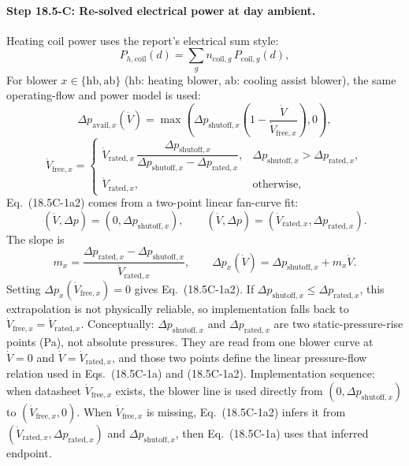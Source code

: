 \documentclass[11pt]{article}
\begin{document}
\paragraph{Step 18.5-C: Re-solved electrical power at day ambient.}
Heating coil power uses the report's electrical sum style:
\begin{equation}
P_{h,\mathrm{coil}}(d)=\sum_g n_{\mathrm{coil},g}\,P_{\mathrm{coil},g}(d),
\tag{31}
\end{equation}
\noindent For blower \(x\in\{\mathrm{hb},\mathrm{ab}\}\) (\(\mathrm{hb}\): heating blower, \(\mathrm{ab}\): cooling assist blower), the same operating-flow and power model is used:
\begin{equation}
\Delta p_{\mathrm{avail},x}(\dot V)=\max\!\left(\Delta p_{\mathrm{shutoff},x}\left(1-\frac{\dot V}{\dot V_{\mathrm{free},x}}\right),0\right),
\tag{18.5C-1a}
\end{equation}
\begin{equation}
\dot V_{\mathrm{free},x}=
\begin{cases}
\dot V_{\mathrm{rated},x}\,\dfrac{\Delta p_{\mathrm{shutoff},x}}{\Delta p_{\mathrm{shutoff},x}-\Delta p_{\mathrm{rated},x}}, & \Delta p_{\mathrm{shutoff},x}>\Delta p_{\mathrm{rated},x},\\[8pt]
\dot V_{\mathrm{rated},x}, & \text{otherwise},
\end{cases}
\tag{18.5C-1a2}
\end{equation}
Eq.~(18.5C-1a2) comes from a two-point linear fan-curve fit:
\[
(\dot V,\Delta p)=(0,\Delta p_{\mathrm{shutoff},x}),
\qquad
(\dot V,\Delta p)=(\dot V_{\mathrm{rated},x},\Delta p_{\mathrm{rated},x}).
\]
The slope is
\[
m_x=\frac{\Delta p_{\mathrm{rated},x}-\Delta p_{\mathrm{shutoff},x}}{\dot V_{\mathrm{rated},x}},
\qquad
\Delta p_x(\dot V)=\Delta p_{\mathrm{shutoff},x}+m_x\dot V.
\]
Setting \(\Delta p_x(\dot V_{\mathrm{free},x})=0\) gives Eq.~(18.5C-1a2). If \(\Delta p_{\mathrm{shutoff},x}\le\Delta p_{\mathrm{rated},x}\), this extrapolation is not physically reliable, so implementation falls back to \(\dot V_{\mathrm{free},x}=\dot V_{\mathrm{rated},x}\).
Conceptually: \(\Delta p_{\mathrm{shutoff},x}\) and \(\Delta p_{\mathrm{rated},x}\) are two static-pressure-rise points (Pa), not absolute pressures. They are read from one blower curve at \(\dot V=0\) and \(\dot V=\dot V_{\mathrm{rated},x}\), and those two points define the linear pressure-flow relation used in Eqs.~(18.5C-1a) and (18.5C-1a2).
Implementation sequence: when datasheet \(\dot V_{\mathrm{free},x}\) exists, the blower line is used directly from \((0,\Delta p_{\mathrm{shutoff},x})\) to \((\dot V_{\mathrm{free},x},0)\). When \(\dot V_{\mathrm{free},x}\) is missing, Eq.~(18.5C-1a2) infers it from \((\dot V_{\mathrm{rated},x},\Delta p_{\mathrm{rated},x})\) and \(\Delta p_{\mathrm{shutoff},x}\), then Eq.~(18.5C-1a) uses that inferred endpoint.
\end{document}
